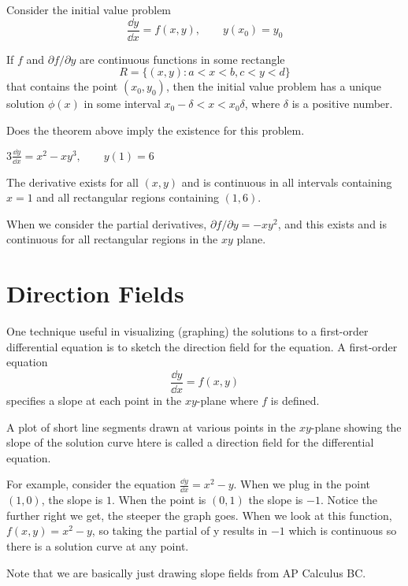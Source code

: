 \documentclass[../diffeq.tex]{subfiles}
\begin{document}
\begin{theorem}
    Consider the initial value problem 
    \[ \frac{\dd y}{\dd x}=f(x,y), \qquad y(x_0)=y_0 \]

    If $f$ and $\partial f/\partial y$ are continuous functions in some rectangle 
    \[ R = \{(x,y): a<x<b, c<y<d\} \]
    that contains the point $(x_0,y_0)$, then the initial value problem has a unique solution $\phi(x)$ in some interval $x_0-\delta<x<x_0\delta$, where $\delta$ is a positive number.
\end{theorem}

\begin{example}
    Does the theorem above imply the existence for this problem.

    $3\frac{\dd y}{\dd x}=x^2-xy^3, \qquad y(1)=6$

    The derivative exists for all $(x,y)$ and is continuous in all intervals containing $x=1$ and all rectangular regions containing $(1,6)$.

    When we consider the partial derivatives, $\partial f/\partial y = -xy^2$, and this exists and is continuous for all rectangular regions in the $xy$ plane.
\end{example}

\section{Direction Fields}
One technique useful in visualizing (graphing) the solutions to a first-order differential equation is to sketch the direction field for the equation. A first-order equation 
\[ \frac{\dd y}{\dd x}=f(x,y)\]
specifies a slope at each point in the $xy$-plane where $f$ is defined.

\begin{definition}
    A plot of short line segments drawn at various points in the $xy$-plane showing the slope of the solution curve htere is called a direction field for the differential equation.
\end{definition}

For example, consider the equation $\frac{\dd y}{\dd x} = x^2-y$. When we plug in the point $(1,0)$, the slope is $1$. When the point is $(0,1)$ the slope is $-1$. Notice the further right we get, the steeper the graph goes.
When we look at this function, $f(x,y)=x^2-y$, so taking the partial of y results in $-1$ which is continuous so there is a solution curve at any point.

Note that we are basically just drawing slope fields from AP Calculus BC.
\end{document}
